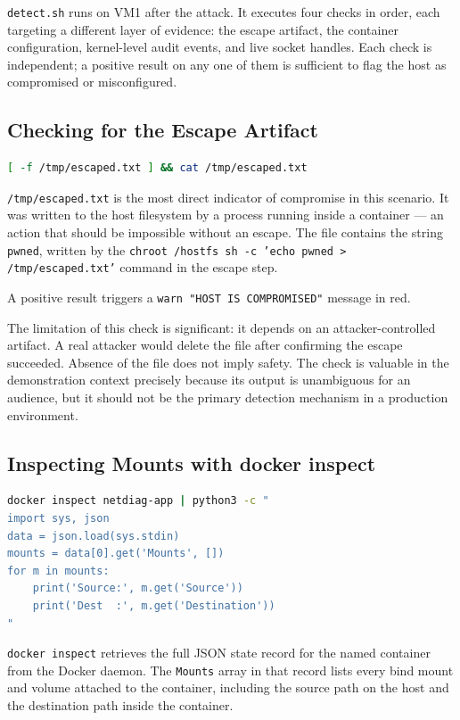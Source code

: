 \texttt{detect.sh} runs on VM1 after the attack. It executes four checks in order, each targeting a different layer of evidence: the escape artifact, the container configuration, kernel-level audit events, and live socket handles. Each check is independent; a positive result on any one of them is sufficient to flag the host as compromised or misconfigured.

\subsection{Checking for the Escape Artifact}

\begin{lstlisting}[language=bash]
[ -f /tmp/escaped.txt ] && cat /tmp/escaped.txt
\end{lstlisting}

\texttt{/tmp/escaped.txt} is the most direct indicator of compromise in this scenario. It was written to the host filesystem by a process running inside a container --- an action that should be impossible without an escape. The file contains the string \texttt{pwned}, written by the \texttt{chroot /hostfs sh -c 'echo pwned > /tmp/escaped.txt'} command in the escape step.

A positive result triggers a \texttt{warn "HOST IS COMPROMISED"} message in red.

The limitation of this check is significant: it depends on an attacker-controlled artifact. A real attacker would delete the file after confirming the escape succeeded. Absence of the file does not imply safety. The check is valuable in the demonstration context precisely because its output is unambiguous for an audience, but it should not be the primary detection mechanism in a production environment.

\subsection{Inspecting Mounts with docker inspect}

\begin{lstlisting}[language=bash]
docker inspect netdiag-app | python3 -c "
import sys, json
data = json.load(sys.stdin)
mounts = data[0].get('Mounts', [])
for m in mounts:
    print('Source:', m.get('Source'))
    print('Dest  :', m.get('Destination'))
"
\end{lstlisting}

\texttt{docker inspect} retrieves the full JSON state record for the named container from the Docker daemon. The \texttt{Mounts} array in that record lists every bind mount and volume attached to the container, including the source path on the host and the destination path inside the container.

